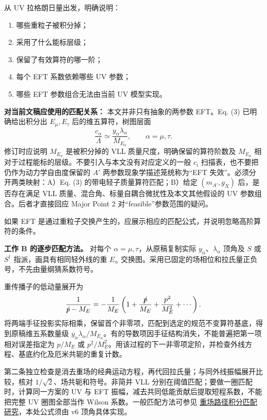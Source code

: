 \documentclass[
  chinese,
  UTF8]{ctexart}
\providecommand{\tightlist}{%
  \setlength{\itemsep}{0pt}\setlength{\parskip}{0pt}}
\providecommand{\slashed}[1]{\mathord{\setbox0=\hbox{$#1$}\hbox to \wd0{\hss$/$\hss}\llap{\box0}}}
\begin{document}
从 UV 拉格朗日量出发，明确说明：

\begin{enumerate}
\def\labelenumi{\arabic{enumi}.}
\tightlist
\item
  哪些重粒子被积分掉；
\item
  采用了什么能标层级；
\item
  保留了有效算符的哪一阶；
\item
  每个 EFT 系数依赖哪些 UV 参数；
\item
  哪些 EFT 参数组合无法由当前 UV 模型实现。
\end{enumerate}

\textbf{对当前文稿应使用的匹配关系：} 本文并非只有抽象的两参数 EFT。Eq.
(3) 已明确给出积分出 \(E_\mu,E_\tau\) 后的维五算符，树图层面 \[
\frac{c_\alpha}{\Lambda}\simeq\frac{y_\alpha\lambda_\alpha}{M_{E_\alpha}},\qquad \alpha=\mu,\tau.
\] 修订时应说明 \(M_{E_\alpha}\) 是被积分掉的 VLL
质量尺度，明确保留的算符阶数及 \(M_{E_\alpha}\)
相对于过程能标的层级。不要引入与本文没有对应定义的一般 \(c_i\)
扫描表，也不要把仍作为动力学自由度保留的 \(A'\)
两参数现象学描述笼统称为``EFT 失效''。必须分开两类映射：A）Eq. (3)
的带电轻子质量算符匹配；B）给定 \((m_{A'},g_X)\) 后，是否存在满足 VLL
质量、混合角、标量自耦合微扰性及本文其他假设的 UV
参数组合。后者才直接回应 Major Point 2 对``feasible''参数范围的疑问。

如果 EFT
是通过重粒子交换产生的，应展示相应的匹配公式，并说明忽略高阶算符的条件。

\textbf{工作 B 的逐步匹配方法。} 对每个
\(\alpha=\mu,\tau\)，从原稿复制实际 \(y_\alpha\)、\(\lambda_\alpha\)
顶角及 \(S\) 或 \(S^\dagger\) 指派，画具有相同轻外线的重 \(E_\alpha\)
交换图。采用已固定的场相位和拉氏量正负号，不先由量纲猜系数符号。

重传播子的低动量展开为 \[
\frac1{\slashed p-M_E}
=-\frac1{M_E}\left(1+\frac{\slashed p}{M_E}
+\frac{p^2}{M_E^2}+\cdots\right).
\]
将两端手征投影实际相乘，保留首个非零项，匹配到选定的规范不变算符基底，得到原稿维五系数量级
\(y_\alpha\lambda_\alpha/M_{E_\alpha}\)。有的导数项因手征结构消失，不能普遍把第一项相对误差指定为
\(p/M_E\) 或
\(p^2/M_E^2\)。用该过程的下一非零项定阶，并检查外线方程、基底约化及厄米共轭的重复计数。

第二条独立检查是消去重场的经典运动方程，再代回拉氏量；与同外线振幅展开比较，核对
\(1/\sqrt2\)、场共轭和符号。非简并 VLL
分别在阈值匹配；要做一圈匹配时，计算同一方案的 UV 与 EFT
振幅，减去共同低能贡献后提取短程系数，不能把完整 UV 圈图全部当作 Wilson
系数。一般匹配方法可参见
\href{https://doi.org/10.1140/epjc/s10052-021-09587-7}{重场路径积分匹配研究}，本处公式须由
v6 顶角具体实现。
\end{document}
